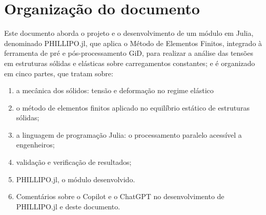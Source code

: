 \section{Organização do documento}

Este documento aborda o projeto e o desenvolvimento de um módulo em Julia, denominado PHILLIPO.jl, que aplica o Método de Elementos Finitos, integrado à ferramenta de pré e pós-processamento GiD, para realizar a análise das tensões em estruturas sólidas e elásticas sobre carregamentos constantes; e é organizado em cinco partes, que tratam sobre:

\begin{enumerate}
    \item a mecânica dos sólidos: tensão e deformação no regime elástico
    \item o método de elementos finitos aplicado no equilíbrio estático de estruturas sólidas;
    \item a linguagem de programação Julia: o processamento paralelo acessível a engenheiros;
    \item validação e verificação de resultados;
    \item PHILLIPO.jl, o módulo desenvolvido.
    \item Comentários sobre o Copilot e o ChatGPT no desenvolvimento de PHILLIPO.jl e deste documento.
\end{enumerate}

